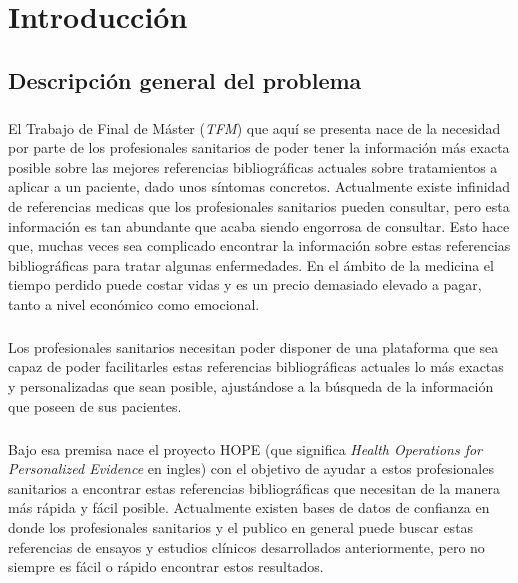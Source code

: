 \chapter{Introducción}
\label{chapter:introduccion}


\section{Descripción general del problema}
\label{def:def1}

\paragraph{}
El Trabajo de Final de Máster (\textit{TFM}) que aquí se presenta nace de la necesidad por parte de los profesionales sanitarios de poder tener la información más exacta posible sobre las mejores referencias bibliográficas actuales sobre tratamientos a aplicar a un paciente, dado unos síntomas concretos. Actualmente existe infinidad de referencias medicas que los profesionales sanitarios pueden consultar, pero esta información es tan abundante que acaba siendo engorrosa de consultar. Esto hace que, muchas veces sea complicado encontrar la información sobre estas referencias bibliográficas para tratar algunas enfermedades. En el ámbito de la medicina el tiempo perdido puede costar vidas y es un precio demasiado elevado a pagar, tanto a nivel económico como emocional.

\paragraph{}
Los profesionales sanitarios necesitan poder disponer de una plataforma que sea capaz de poder facilitarles estas referencias bibliográficas actuales lo más exactas y personalizadas que sean posible, ajustándose a la búsqueda de la información que poseen de sus pacientes.

\paragraph{}
Bajo esa premisa nace el proyecto HOPE (que significa \textit{Health Operations for Personalized Evidence} en ingles) con el objetivo de ayudar a estos profesionales sanitarios a encontrar estas referencias bibliográficas que necesitan de la manera más rápida y fácil posible. Actualmente existen bases de datos de confianza en donde los profesionales sanitarios y el publico en general puede buscar estas referencias de ensayos y estudios clínicos desarrollados anteriormente, pero no siempre es fácil o rápido encontrar estos resultados.

